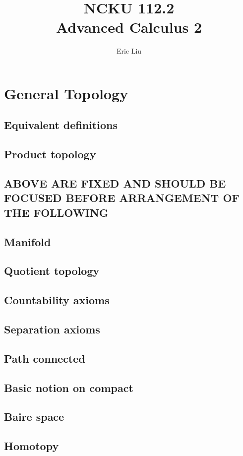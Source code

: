 \documentclass{report}
\title{\Huge{NCKU 112.2}\\
Advanced Calculus 2}
\author{\huge{Eric Liu}}
\date{}
\begin{document}
\maketitle
\newpage%
\tableofcontents
\pagebreak

\chapter{General Topology}
\section{Equivalent definitions}
\section{Product topology}
\section{ABOVE ARE FIXED AND SHOULD BE FOCUSED BEFORE ARRANGEMENT OF THE FOLLOWING}
\section{Manifold}
\section{Quotient topology}
\section{Countability axioms}
\section{Separation axioms}
\section{Path connected}
\section{Basic notion on compact}
\section{Baire space}
\section{Homotopy}
\end{document}
